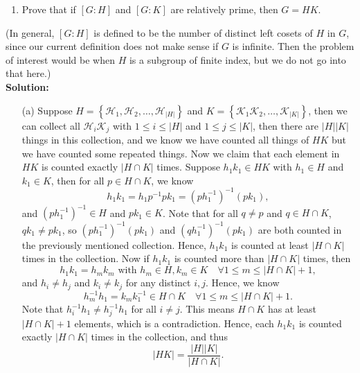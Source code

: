 \documentclass[a4paper,12pt]{article}
\begin{document}
\begin{enumerate}
\begin{enumerate}[label=(\alph*)]
        \item Prove that if $[G : H]$ and $[G : K]$ are relatively prime, then $G = HK$.
    \end{enumerate}
    (In general, $[G : H]$ is defined to be the number of distinct left cosets of $H$ in $G$, since our current definition does not make sense if $G$ is infinite. Then the problem of interest would be when $H$ is a subgroup of finite index, but we do not go into that here.) \\
    \textbf{Solution:} 
    \begin{itemize}
        \item [(a)] Suppose \(H = \left\{ \mathcal{H} _1, \mathcal{H} _2, \dots , \mathcal{H} _{\vert H \vert } \right\} \) and \(K = \left\{ \mathcal{K} _1 \mathcal{K} _2, \dots , \mathcal{K} _{\vert K \vert } \right\} \), then we can collect all \(\mathcal{H} _i \mathcal{K} _j\) with \(1 \le i \le \vert H \vert \) and \(1 \le j \le \vert K \vert \), then there are \(\vert H \vert \vert K \vert \) things in this collection, and we know we have counted all things of \(HK\) but we have counted some repeated things. Now we claim that each element in \(HK\) is counted exactly \(\vert H \cap K \vert \) times. Suppose \(h_1 k_1 \in HK\) with \(h_1 \in H\) and \(k_1 \in K\), then for all \(p \in H \cap K\), we know 
        \[
            h_1 k_1 = h_1 p^{-1} p k_1 = \left( p h_1^{-1} \right)^{-1} \left( p k_1 \right),  
        \] and \(\left( p h_1^{-1} \right)^{-1} \in H \) and \(p k_1 \in K\). Note that for all \(q \neq p\) and \(q \in H \cap K\), \(q k_1 \neq p k_1\), so \(\left( ph_1^{-1} \right)^{-1} \left( pk_1 \right)  \) and \(\left( q h_1^{-1} \right)^{-1} \left( pk_1 \right)  \) are both counted in the previously mentioned collection. Hence, \(h_1 k_1\) is counted at least \(\vert H \cap K \vert \) times in the collection. Now if \(h_1 k_1\) is counted more than \(\vert H \cap K \vert \) times, then
        \[
            h_1 k_1 = h_m k_m \text{ with } h_m \in H, k_m \in K \quad \forall 1 \le m \le \vert H \cap K \vert + 1,
        \] and \(h_i \neq h_j\) and \(k_i \neq k_j\) for any distinct \(i, j\). Hence, we know 
        \[
            h_m^{-1} h_1 = k_m k_1^{-1} \in H \cap K \quad \forall 1 \le m \le \vert H \cap K \vert + 1. 
        \] Note that \(h_i^{-1} h_1 \neq h_j^{-1} h_1\) for all \(i \neq j\). This means \(H \cap K\) has at least \(\vert H \cap K \vert + 1\) elements, which is a contradiction. Hence, each \(h_1 k_1\) is counted exactly \(\vert H \cap K \vert \) times in the collection, and thus 
        \[
            \left\vert HK \right\vert = \frac{\vert H \vert \vert K \vert}{\vert H \cap K \vert }.
\]
\end{itemize}
\end{enumerate}
\end{document}
